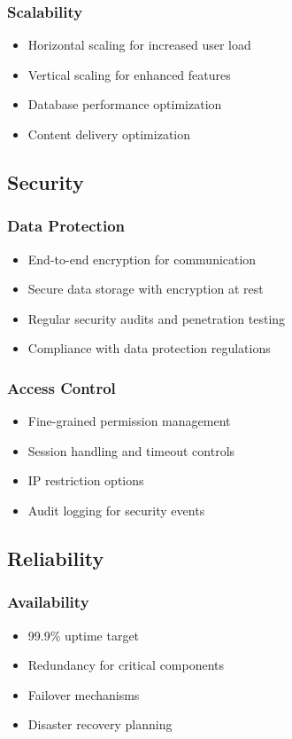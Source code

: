 \documentclass[12pt,a4paper]{report}
\begin{document}
\subsubsection{Scalability}
\begin{itemize}
   \item Horizontal scaling for increased user load
   \item Vertical scaling for enhanced features
   \item Database performance optimization
   \item Content delivery optimization
\end{itemize}

\subsection{Security}
\subsubsection{Data Protection}
\begin{itemize}
   \item End-to-end encryption for communication
   \item Secure data storage with encryption at rest
   \item Regular security audits and penetration testing
   \item Compliance with data protection regulations
\end{itemize}

\subsubsection{Access Control}
\begin{itemize}
   \item Fine-grained permission management
   \item Session handling and timeout controls
   \item IP restriction options
   \item Audit logging for security events
\end{itemize}

\subsection{Reliability}
\subsubsection{Availability}
\begin{itemize}
   \item 99.9\% uptime target
   \item Redundancy for critical components
   \item Failover mechanisms
   \item Disaster recovery planning
\end{itemize}
\end{document}
